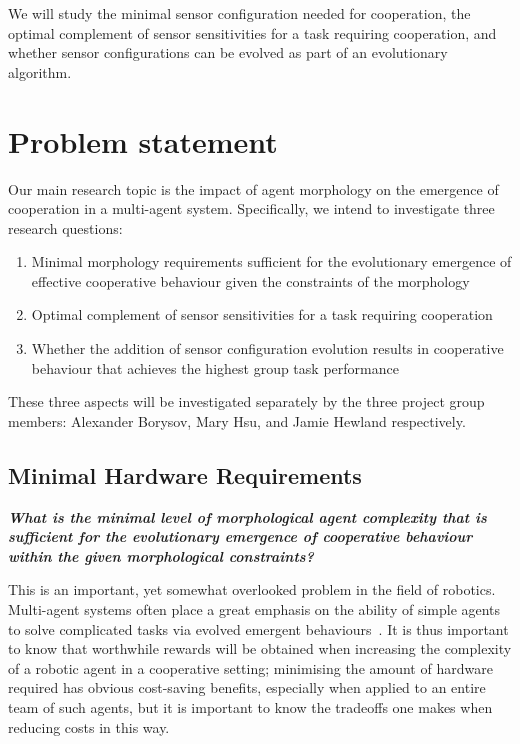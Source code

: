 \documentclass[a4paper,12pt]{article}
\begin{document}
We will study the minimal sensor configuration needed for cooperation, the optimal complement of sensor sensitivities for a task requiring cooperation, and whether sensor configurations can be evolved as part of an evolutionary algorithm.

\section{Problem statement}
Our main research topic is the impact of agent morphology on the emergence of cooperation in a multi-agent system. Specifically, we intend to investigate three research questions:

\begin{enumerate}
\item Minimal morphology requirements sufficient for the evolutionary emergence of effective cooperative behaviour given the constraints of the morphology
\item Optimal complement of sensor sensitivities for a task requiring cooperation
\item Whether the addition of sensor configuration evolution results in cooperative behaviour that achieves the highest group task performance
\end{enumerate}

These three aspects will be investigated separately by the three project group members: Alexander Borysov, Mary Hsu, and Jamie Hewland respectively.

\subsection{Minimal Hardware Requirements}

\textbf{ \textit{What is the minimal level of morphological agent complexity that is sufficient for the evolutionary emergence of cooperative behaviour within the given morphological constraints?}}

This is an important, yet somewhat overlooked problem in the field of robotics. Multi-agent systems often place a great emphasis on the ability of simple agents to solve complicated tasks via evolved emergent behaviours~\cite{panait}. It is thus important to know that worthwhile rewards will be obtained when increasing the complexity of a robotic agent in a cooperative setting; minimising the amount of hardware required has obvious cost-saving benefits, especially when applied to an entire team of such agents, but it is important to know the tradeoffs one makes when reducing costs in this way.
\end{document}
